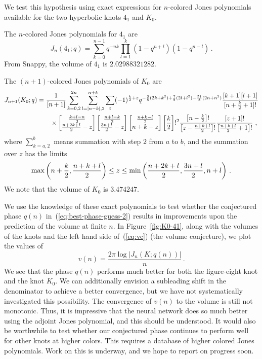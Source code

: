 \documentclass[11pt]{article}
\newcommand{\nn}{\nonumber}
\newcommand{\eref}[1]{(\ref{#1})}
\begin{document}
We test this hypothesis using exact expressions for $n$-colored Jones polynomials available for the two hyperbolic knots $4_1$ and $K_0$.

The $n$-colored Jones polynomials for $4_1$ are~\cite{Le:2000, Habiro:2000, Murakami:2022}
\begin{equation}
    J_n(4_1;q) = \sum_{k=0}^{n-1} q^{-nk} \prod_{l=1}^k (1-q^{n+l}) (1-q^{n-l}) \,.
\end{equation}
From Snappy, the volume of $4_1$ is $2.02988321282$.

The $(n+1)$-colored Jones polynomials of $K_0$ are~\cite{Garoufalidis:2004}
\begin{align}
  J_{n+1}(K_0;q) =&\ \frac1{[n+1]}\sum_{k=0,2}^{2n}\sum_{l=|n-k|,2}^{n+k}\sum_z(-1)^{\frac k2+z}q^{-\frac38(2k+k^2)+\frac78(2l+l^2)-\frac{51}8(2n+n^2)}\frac{[k+1][l+1]}{[n+\frac k2+1]!}   \nn \\
  & \quad \times \begin{bmatrix} \frac{k+l-n}2 \\ \frac{n+2k+l}2 - z  \end{bmatrix} \begin{bmatrix} \frac{n+l-k}2 \\ \frac{3n+l}2 - z  \end{bmatrix} \begin{bmatrix} \frac{n+k-l}2 \\ n+k - z  \end{bmatrix} \lB\frac k2 \rB!^2 \frac{\lB n-\frac k2 \rB!}{\lB z-\frac{n+k+l}2 \rB!}\frac{[z+1]!}{\lB \frac{n+k+l}2+1 \rB!} \ ,   
\end{align}
where $\sum_{k=a,2}^b$ means summation with step $2$ from $a$ to $b$, and the summation over $z$ has the limits
\begin{equation}
    \max\left ( n+\frac k2,\frac{n+k+l}2 \right ) \leq z\leq \min\left ( \frac{n+2k+l}2,\frac{3n+l}2, n+l \right ) \,.
\end{equation}
We note that the volume of $K_0$ is $3.474247$.

We use the knowledge of these exact polynomials to test whether the conjectured phase $q(n)$ in~(\ref{eq:best-phase-guess-2}) results in improvements upon the prediction of the volume at finite $n$.
In Figure~\ref{fig:K0-41}, along with the volumes of the knots and the left hand side of~\eref{eq:vc} (the volume conjecture), we plot the values of
\begin{equation}\label{eq:vc2}
	v(n) = \frac{2\pi\log|J_n(K;q(n))|}n \,.
\end{equation}
We see that the phase $q(n)$ performs much better for both the figure-eight knot and the knot $K_0$.
We can additionally envision a subleading shift in the denominator to achieve a better convergence, but we have not systematically investigated this possibility.
The convergence of $v(n)$ to the volume is still not monotonic.
Thus, it is impressive that the neural network does so much better using the adjoint Jones polynomial, and this should be understood.
It would also be worthwhile to test whether our conjectured phase continues to perform well for other knots at higher colors.
This requires a database of higher colored Jones polynomials.
Work on this is underway, and we hope to report on progress soon.
\end{document}
